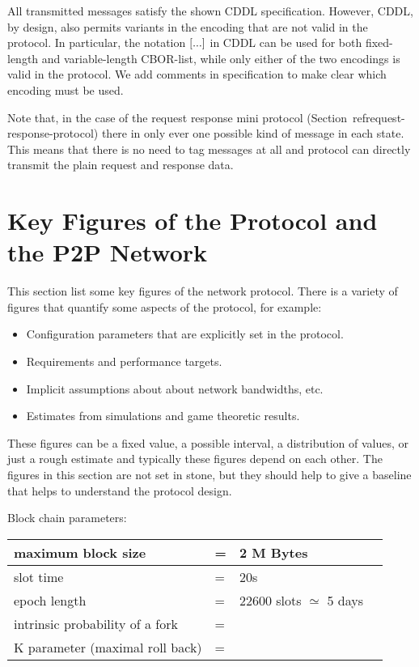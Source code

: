 \documentclass{report}
\newcommand{\wip}[1]{\color{magenta}{#1}\color{black}}
\theoremstyle{definition}{
  \newtheorem{lemma}{Lemma}[section] %
  \newtheorem{definition}[lemma]{Definition}
}
\theoremstyle{theorem}{
  \newtheorem{invariant}[lemma]{Invariant}
  \newtheorem{proofobligation}[lemma]{Proof Obligation}
}
\numberwithin{equation}{lemma}
\begin{document}
All transmitted messages satisfy the shown CDDL specification.
However, CDDL, by design, also permits variants in the encoding that are not valid in the protocol.
In particular, the notation ${\tt [} ... {\tt ]}$ in CDDL can be used for both fixed-length  
and variable-length CBOR-list, while only either of the two encodings is valid in the protocol.
We add comments in specification to make clear which encoding must be used.

Note that, in the case of the request response mini protocol (Section~ref{request-response-protocol})
there in only ever one possible kind of message in each state.
This means that there is no need to tag messages at all and protocol can directly transmit the plain
request and response data.

\wip{TODO: test that messages.cddl actually works !}




\section{Key Figures of the Protocol and the P2P Network}
This section list some key figures of the network protocol.
There is a variety of figures that quantify some aspects of the protocol, for example:
\begin{itemize}
\item Configuration parameters that are explicitly set in the protocol.
\item Requirements and performance targets.
\item Implicit assumptions about about network bandwidths, etc.
\item Estimates from simulations and game theoretic results.
\end{itemize}
These figures can be a fixed value, a possible interval, a distribution of values,
or just a rough estimate and typically these figures depend on each other.
The figures in this section are not set in stone, but they should help to give a baseline that helps
to understand the protocol design.

Block chain parameters:\\
\begin{tabular}{p{4cm}p{1cm}p{6cm}p{1cm}} \hline
  maximum block size   & = & 2 M Bytes                                    &  \\ \hline
  slot time            & = & 20s                                          &  \\ \hline
  epoch length         & = & 22600 slots $\simeq$ 5 days                  &  \\ \hline
  intrinsic probability of a fork & = &                                   &  \\ \hline
  K parameter (maximal roll back) & = &                                   &  \\ \hline
\end{tabular}\\
\end{document}
